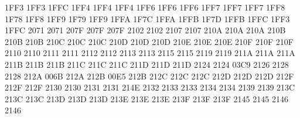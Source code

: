 \setcclcuc 1FF3 1FF3 1FFC %
\setcclcuc 1FF4 1FF4 1FF4 %
\setcclcuc 1FF6 1FF6 1FF6 %
\setcclcuc 1FF7 1FF7 1FF7 %
\setcclcuc 1FF8 1F78 1FF8 %
\setcclcuc 1FF9 1F79 1FF9 %
\setcclcuc 1FFA 1F7C 1FFA %
\setcclcuc 1FFB 1F7D 1FFB %
\setcclcuc 1FFC 1FF3 1FFC %
 2071 2071 %
\setcclcuc 207F 207F 207F %
 2102 2102 %
 2107 2107 %
\setcclcuc 210A 210A 210A %
\setcclcuc 210B 210B 210B %
\setcclcuc 210C 210C 210C %
\setcclcuc 210D 210D 210D %
\setcclcuc 210E 210E 210E %
\setcclcuc 210F 210F 210F %
 2110 2110 %
 2111 2111 %
 2112 2112 %
 2113 2113 %
 2115 2115 %
 2119 2119 %
\setcclcuc 211A 211A 211A %
\setcclcuc 211B 211B 211B %
\setcclcuc 211C 211C 211C %
\setcclcuc 211D 211D 211D %
 2124 2124 %
 03C9 2126 %
 2128 2128 %
\setcclcuc 212A 006B 212A %
\setcclcuc 212B 00E5 212B %
\setcclcuc 212C 212C 212C %
\setcclcuc 212D 212D 212D %
\setcclcuc 212F 212F 212F %
 2130 2130 %
 2131 2131 %
 214E 2132 %
 2133 2133 %
 2134 2134 %
 2139 2139 %
\setcclcuc 213C 213C 213C %
\setcclcuc 213D 213D 213D %
\setcclcuc 213E 213E 213E %
\setcclcuc 213F 213F 213F %
 2145 2145 %
 2146 2146 %
